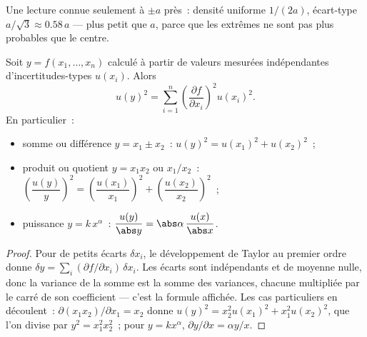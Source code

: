\begin{omfigure}

{\small Une lecture connue seulement à $\pm a$ près~: densité uniforme
$1/(2a)$, écart-type $a/\sqrt3 \approx 0.58\,a$ --- plus petit que $a$,
parce que les extrêmes ne sont pas plus probables que le centre.}
\end{omfigure}

\begin{theorem}\label{thm:b1:units-dimensions:propagation}
Soit $y = f(x_1, \dots, x_n)$ calculé à partir de valeurs mesurées
indépendantes d'incertitudes-types $u(x_i)$. Alors
\[
u(y)^2 = \sum_{i=1}^n \left(\frac{\partial f}{\partial x_i}\right)^2 u(x_i)^2 .
\]
En particulier~:
\begin{itemize}
  \item somme ou différence $y = x_1 \pm x_2$~:
        $u(y)^2 = u(x_1)^2 + u(x_2)^2$~;
  \item produit ou quotient $y = x_1 x_2$ ou $x_1/x_2$~:
        $\left(\dfrac{u(y)}{y}\right)^2 = \left(\dfrac{u(x_1)}{x_1}\right)^2
        + \left(\dfrac{u(x_2)}{x_2}\right)^2$~;
  \item puissance $y = k\,x^\alpha$~: $\dfrac{u(y)}{\abs y} = \abs\alpha\,\dfrac{u(x)}{\abs x}$.
\end{itemize}
\end{theorem}

\begin{proof}
Pour de petits écarts $\delta x_i$, le développement de Taylor au
premier ordre donne $\delta y = \sum_i (\partial f/\partial x_i)\,\delta x_i$.
Les écarts sont indépendants et de moyenne nulle, donc la variance de la
somme est la somme des variances, chacune multipliée par le carré de son
coefficient --- c'est la formule affichée. Les cas particuliers en
découlent~: $\partial(x_1 x_2)/\partial x_1 = x_2$ donne
$u(y)^2 = x_2^2 u(x_1)^2 + x_1^2 u(x_2)^2$, que l'on divise par
$y^2 = x_1^2 x_2^2$~; pour $y = kx^\alpha$, $\partial y/\partial x = \alpha y/x$.
\end{proof}

